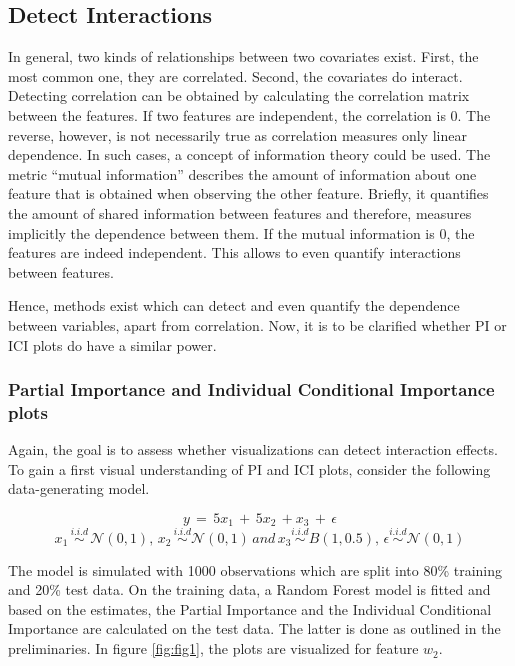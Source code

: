 \documentclass[
]{krantz}
\begin{document}
\hypertarget{ch31}{%
\subsection{Detect Interactions}\label{ch31}}

In general, two kinds of relationships between two covariates exist. First, the most common one, they are correlated. Second, the covariates do interact. Detecting correlation can be obtained by calculating the correlation matrix between the features. If two features are independent, the correlation is 0. The reverse, however, is not necessarily true as correlation measures only linear dependence. In such cases, a concept of information theory could be used. The metric ``mutual information'' describes the amount of information about one feature that is obtained when observing the other feature. Briefly, it quantifies the amount of shared information between features and therefore, measures implicitly the dependence between them. If the mutual information is 0, the features are indeed independent. This allows to even quantify interactions between features.

Hence, methods exist which can detect and even quantify the dependence between variables, apart from correlation. Now, it is to be clarified whether PI or ICI plots do have a similar power.

\hypertarget{ch311}{%
\subsubsection{Partial Importance and Individual Conditional Importance plots}\label{ch311}}

Again, the goal is to assess whether visualizations can detect interaction effects. To gain a first visual understanding of PI and ICI plots, consider the following data-generating model.

\[ y \, = \, 5x_{1} \,  + \, 5x_{2} \, + x_{3}  \, + \, \epsilon\]
\[ x_{1} \, \overset{i.i.d}{\sim} \, \mathcal{N}(0,1), \, x_{2} \, \overset{i.i.d}{\sim}  \mathcal{N}(0, 1) \, and \, x_{3} \overset{i.i.d}{\sim} B(1, 0.5),\,  \epsilon \overset{i.i.d}{\sim} \mathcal{N}(0, 1)\]

The model is simulated with 1000 observations which are split into 80\% training and 20\% test data. On the training data, a Random Forest model is fitted and based on the estimates, the Partial Importance and the Individual Conditional Importance are calculated on the test data. The latter is done as outlined in the preliminaries. In figure \ref{fig:fig1}, the plots are visualized for feature \(w_{2}\).
\end{document}
